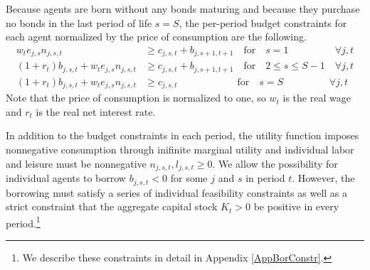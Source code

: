 \documentclass[letterpaper,12pt]{article}
\theoremstyle{definition}
\begin{document}
\begin{spacing}{1.5}
    Because agents are born without any bonds maturing and because they purchase no bonds in the last period of life $s=S$, the per-period budget constraints for each agent normalized by the price of consumption are the following.
    \begin{align}
      w_t e_{j,s}n_{j,s,t} &\geq c_{j,s,t} + b_{j,s+1,t+1} \quad \text{for} \quad s = 1 \quad\quad\quad\quad\:\:\: \forall j,t \label{EqBC1} \\
      \left(1 + r_t\right) b_{j,s,t} + w_t e_{j,s}n_{j,s,t} &\geq c_{j,s,t} + b_{j,s+1,t+1} \quad \text{for} \quad 2\leq s \leq S-1 \quad \forall j,t \label{EqBC2} \\
      \left(1 + r_t\right) b_{j,s,t} + w_t e_{j,s}n_{j,s,t} &\geq c_{j,s,t} \quad\quad\quad\quad\quad\quad \text{for} \quad s = S \quad\quad\quad\quad\:\:\, \forall j,t \label{EqBC3}
    \end{align}
    Note that the price of consumption is normalized to one, so $w_t$ is the real wage and $r_t$ is the real net interest rate.

    In addition to the budget constraints in each period, the utility function imposes nonnegative consumption through inifinite marginal utility and individual labor and leisure must be nonnegative $n_{j,s,t},l_{j,s,t}\geq 0$. We allow the possibility for individual agents to borrow $b_{j,s,t}<0$ for some $j$ and $s$ in period $t$. However, the borrowing must satisfy a series of individual feasibility constraints as well as a strict constraint that the aggregate capital stock $K_t>0$ be positive in every period.\footnote{We describe these constraints in detail in Appendix \ref{AppBorConstr}.}


\end{spacing}
\end{document}
